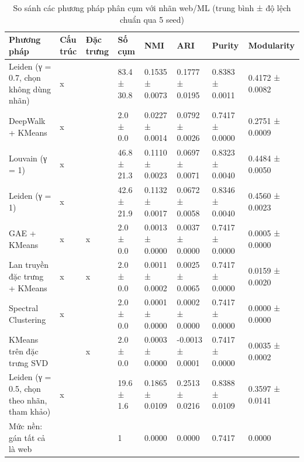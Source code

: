 \begin{table}[htbp]
\caption{So sánh các phương pháp phân cụm với nhãn web/ML (trung bình ± độ lệch chuẩn qua 5 seed)}
\label{tab:rq2_comparison}
\begin{tabular}{llllllll}
\toprule
Phương pháp & Cấu trúc & Đặc trưng & Số cụm & NMI & ARI & Purity & Modularity \\
\midrule
Leiden (γ = 0.7, chọn không dùng nhãn) & x &  & 83.4 ± 30.8 & 0.1535 ± 0.0073 & 0.1777 ± 0.0195 & 0.8383 ± 0.0011 & 0.4172 ± 0.0082 \\
DeepWalk + KMeans & x &  & 2.0 ± 0.0 & 0.0227 ± 0.0014 & 0.0792 ± 0.0026 & 0.7417 ± 0.0000 & 0.2751 ± 0.0009 \\
Louvain (γ = 1) & x &  & 46.8 ± 21.3 & 0.1110 ± 0.0023 & 0.0697 ± 0.0071 & 0.8323 ± 0.0040 & 0.4484 ± 0.0050 \\
Leiden (γ = 1) & x &  & 42.6 ± 21.9 & 0.1132 ± 0.0017 & 0.0672 ± 0.0058 & 0.8346 ± 0.0040 & 0.4560 ± 0.0023 \\
GAE + KMeans & x & x & 2.0 ± 0.0 & 0.0013 ± 0.0000 & 0.0037 ± 0.0000 & 0.7417 ± 0.0000 & 0.0005 ± 0.0000 \\
Lan truyền đặc trưng + KMeans & x & x & 2.0 ± 0.0 & 0.0011 ± 0.0002 & 0.0025 ± 0.0065 & 0.7417 ± 0.0000 & 0.0159 ± 0.0020 \\
Spectral Clustering & x &  & 2.0 ± 0.0 & 0.0001 ± 0.0000 & 0.0002 ± 0.0000 & 0.7417 ± 0.0000 & 0.0000 ± 0.0000 \\
KMeans trên đặc trưng SVD &  & x & 2.0 ± 0.0 & 0.0003 ± 0.0000 & -0.0013 ± 0.0001 & 0.7417 ± 0.0000 & 0.0035 ± 0.0002 \\
Leiden (γ = 0.5, chọn theo nhãn, tham khảo) & x &  & 19.6 ± 1.6 & 0.1865 ± 0.0109 & 0.2513 ± 0.0216 & 0.8388 ± 0.0109 & 0.3597 ± 0.0141 \\
Mức nền: gán tất cả là web &  &  & 1 & 0.0000 & 0.0000 & 0.7417 & 0.0000 \\
\bottomrule
\end{tabular}
\end{table}
